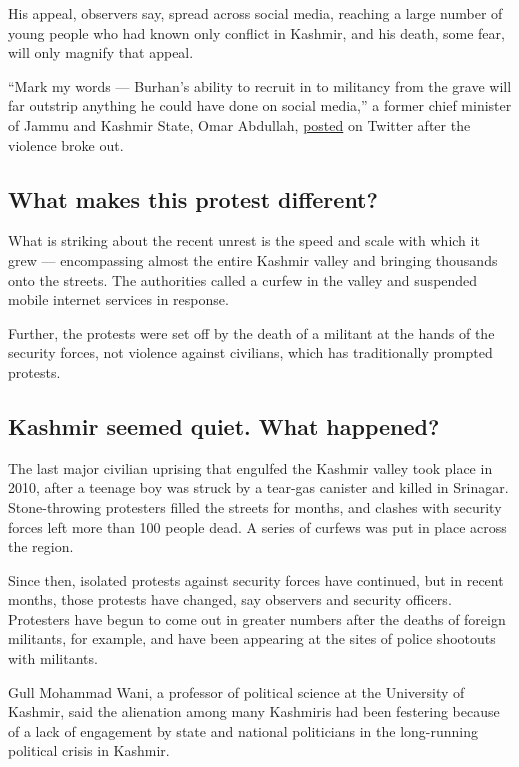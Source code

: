 His appeal, observers say, spread across social media, reaching a large
number of young people who had known only conflict in Kashmir, and his
death, some fear, will only magnify that appeal.

``Mark my words --- Burhan's ability to recruit in to militancy from the
grave will far outstrip anything he could have done on social media,'' a
former chief minister of Jammu and Kashmir State, Omar Abdullah,
\href{https://twitter.com/abdullah_omar/status/751641720195080192}{posted}
on Twitter after the violence broke out.

\hypertarget{what-makes-this-protest-different}{%
\subsection{What makes this protest
different?}\label{what-makes-this-protest-different}}

What is striking about the recent unrest is the speed and scale with
which it grew --- encompassing almost the entire Kashmir valley and
bringing thousands onto the streets. The authorities called a curfew in
the valley and suspended mobile internet services in response.

Further, the protests were set off by the death of a militant at the
hands of the security forces, not violence against civilians, which has
traditionally prompted protests.

\hypertarget{kashmir-seemed-quiet-what-happened}{%
\subsection{Kashmir seemed quiet. What
happened?}\label{kashmir-seemed-quiet-what-happened}}

The last major civilian uprising that engulfed the Kashmir valley took
place in 2010, after a teenage boy was struck by a tear-gas canister and
killed in Srinagar. Stone-throwing protesters filled the streets for
months, and clashes with security forces left more than 100 people dead.
A series of curfews was put in place across the region.

Since then, isolated protests against security forces have continued,
but in recent months, those protests have changed, say observers and
security officers. Protesters have begun to come out in greater numbers
after the deaths of foreign militants, for example, and have been
appearing at the sites of police shootouts with militants.

Gull Mohammad Wani, a professor of political science at the University
of Kashmir, said the alienation among many Kashmiris had been festering
because of a lack of engagement by state and national politicians in the
long-running political crisis in Kashmir.

